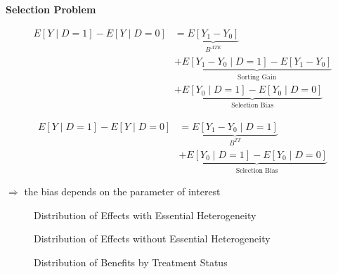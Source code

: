 \begin{frame}
\textbf{Selection Problem}

\begin{align*}
E[Y\mid D = 1] - E[Y\mid D = 0] & = \underbrace{E[Y_1 - Y_0]}_{B^{ATE}} \\
	 							& + \underbrace{E[Y_1 - Y_0 \mid D = 1] - E[Y_1 - Y_0]}_{\text{Sorting Gain}} \\
								& + \underbrace{E[Y_0\mid D = 1] - E[Y_0 \mid D = 0]}_{\text{Selection Bias}}
\end{align*}

\end{frame}


\begin{frame}

\begin{align*}
E[Y\mid D = 1] - E[Y\mid D = 0] & = \underbrace{E[Y_1 - Y_0\mid D = 1]}_{B^{TT}} \\
& + \underbrace{E[Y_0\mid D= 1]- E[Y_0 \mid D = 0]}_{\text{Selection Bias}}
\end{align*}

\(\Rightarrow\) the bias depends on the parameter of interest

\end{frame}

\begin{frame}
\begin{figure}\caption{Distribution of Effects with Essential Heterogeneity}
\end{figure}
\end{frame}

\begin{frame}
\begin{figure}\caption{Distribution of Effects without Essential Heterogeneity}
\end{figure}
\end{frame}

\begin{frame}
\begin{figure}\caption{Distribution of Benefits by Treatment Status}
\end{figure}
\end{frame}

